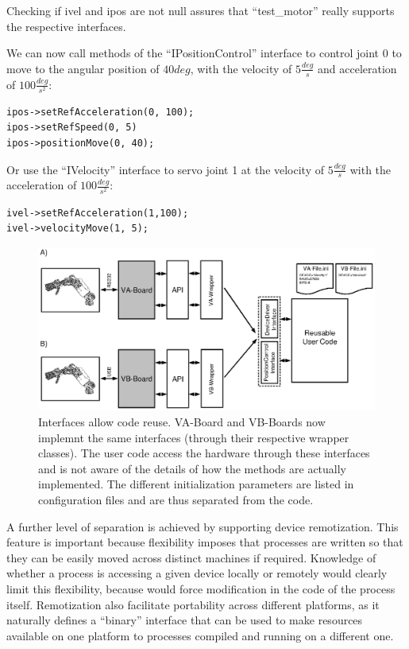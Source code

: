 Checking if ivel and ipos are not null assures that ``test\_motor'' really supports
the respective interfaces.

We can now call methods of the ``IPositionControl'' interface to control 
joint $0$ to move to the angular position of $40deg$, with the velocity of $5\frac{deg}{s}$ and acceleration of $100\frac{deg}{s^2}$:

\begin{verbatim}
ipos->setRefAcceleration(0, 100);
ipos->setRefSpeed(0, 5)
ipos->positionMove(0, 40);
\end{verbatim}

Or use the ``IVelocity'' interface to servo joint 1 at the velocity of 
$5\frac{deg}{s}$ with the acceleration of $100\frac{deg}{s^2}$:

\begin{verbatim}
ivel->setRefAcceleration(1,100);
ivel->velocityMove(1, 5);
\end{verbatim}

\begin{figure}[tbp]
\centerline{
\includegraphics[width=24cm]{fig-devices2.eps}
}
\caption{Interfaces allow code reuse. VA-Board and VB-Boards now implemnt
the same interfaces (through their respective wrapper classes). The user 
code access the hardware through these interfaces and is not aware of 
the details of how the methods are actually implemented. The different 
initialization parameters are listed in configuration files and are thus 
separated from the code.}\label{fig:devices2}
\end{figure}

A further level of separation is achieved by supporting device remotization. 
This feature is important because flexibility imposes 
that processes are written so that they can be easily moved across distinct machines 
if required. Knowledge of whether a process is accessing a given device locally or 
remotely would clearly limit this flexibility, because would force modification 
in the code of the process itself. Remotization also facilitate portability 
across different platforms, as it naturally defines a ``binary'' interface that can 
be used to make resources available on one platform to processes compiled and running 
on a different one.

